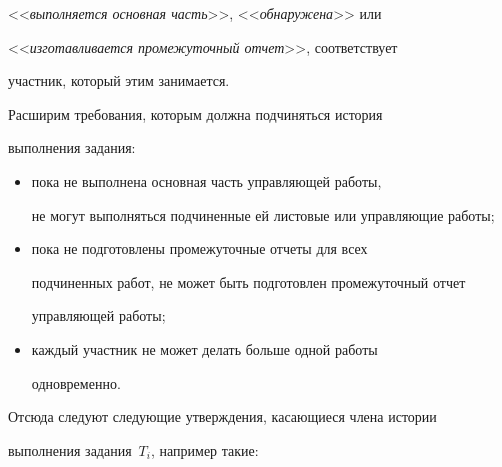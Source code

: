 <<\textit{выполняется основная часть}>>, <<\textit{обнаружена}>> или 


<<\textit{изготавливается промежуточный отчет}>>, соответствует 


участник, который этим занимается. 


      


      Расширим требования, которым должна подчиняться история 


выполнения задания: 


      \begin{itemize}


\item  пока не выполнена основная часть управляющей работы, 


не могут выполняться подчиненные ей листовые или управляющие работы;\\[-15pt]


\item  пока не подготовлены промежуточные отчеты для всех 


подчиненных работ, не может быть подготовлен промежуточный отчет 


управляющей работы;\\[-15pt]


\item  каждый участник не может делать больше одной работы 


одновременно. 


\end{itemize}





Отсюда следуют следующие утверждения, касающиеся члена истории 


выполнения задания~$T_i$, например такие:






